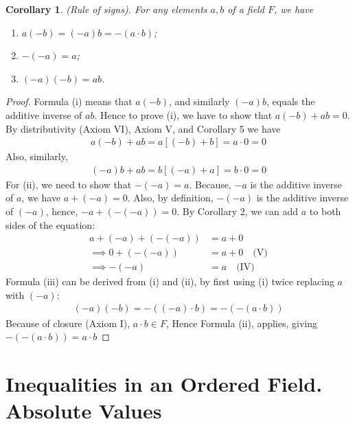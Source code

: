 \documentclass[12pt]{book}
\newtheorem{corollary}{Corollary}
\theoremstyle{definition}
\begin{document}
\begin{corollary} (Rule of signs). For any elements $a,b$ of a field $F$, we have
\begin{enumerate}[label=({\roman*})]
	\item $a(-b) = (-a)b = -(a\cdot b)$;
	\item $-(-a)=a$;
	\item $(-a)(-b) = ab$.
\end{enumerate} 
	
\end{corollary}
\begin{proof}
Formula (i) means that $a(-b)$, and similarly $(-a)b$, equals the additive inverse of $ab$. Hence to prove (i), we have to show that $a(-b) +ab=0$. By distributivity (Axiom VI), Axiom V, and Corollary 5 we have
\begin{align*}
	a(-b) +ab = a[(-b)+b] = a \cdot 0 = 0
\end{align*}
Also, similarly,  
\begin{align*}
(-a)b +ab = b[(-a)+a] = b\cdot 0 =0	
\end{align*}
For (ii), we need to show that $-(-a) =a$. Because, $-a$ is the additive inverse of $a$, we have $a+(-a)=0$. Also, by definition, $-(-a)$ is the additive inverse of $(-a)$, hence, $-a+(-(-a))=0$. By Corollary 2, we can add $a$ to both sides of the equation:
\begin{align*}
	a+ (-a) +(-(-a))&=a+0\\
	\implies 0+(-(-a))&=a+0 \quad \text{(V)}\\
	\implies -(-a)&=a \quad 	\text{(IV)}
\end{align*}
Formula (iii) can be derived from (i) and (ii), by first using (i) twice replacing $a$ with $(-a)$:
\begin{align*}
	(-a)(-b) = -((-a) \cdot b) = -(-(a\cdot b))
\end{align*}
Because of closure (Axiom I), $a\cdot b \in F$, Hence Formula (ii), applies, giving $-(-(a\cdot b)) = a \cdot b$
\end{proof}


\section{Inequalities in an Ordered Field. Absolute Values}
\end{document}
